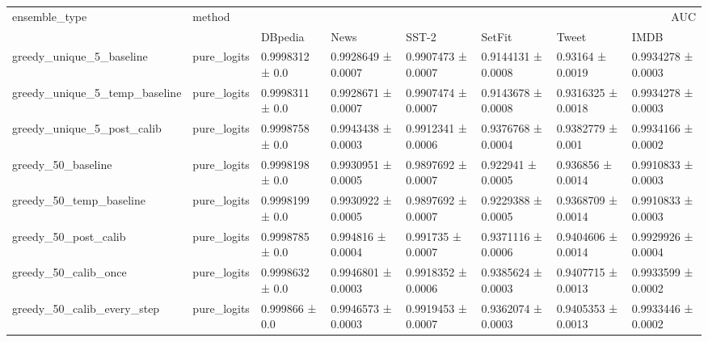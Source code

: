 \begin{tabular}{llllllll}
\toprule
ensemble_type & method & \multicolumn{6}{r}{AUC} \\
 &  & DBpedia & News & SST-2 & SetFit & Tweet & IMDB \\
\midrule
greedy_unique_5_baseline & pure_logits & 0.9998312 ± 0.0 & 0.9928649 ± 0.0007 & 0.9907473 ± 0.0007 & 0.9144131 ± 0.0008 & 0.93164 ± 0.0019 & 0.9934278 ± 0.0003 \\
greedy_unique_5_temp_baseline & pure_logits & 0.9998311 ± 0.0 & 0.9928671 ± 0.0007 & 0.9907474 ± 0.0007 & 0.9143678 ± 0.0008 & 0.9316325 ± 0.0018 & 0.9934278 ± 0.0003 \\
greedy_unique_5_post_calib & pure_logits & 0.9998758 ± 0.0 & 0.9943438 ± 0.0003 & 0.9912341 ± 0.0006 & 0.9376768 ± 0.0004 & 0.9382779 ± 0.001 & 0.9934166 ± 0.0002 \\
greedy_50_baseline & pure_logits & 0.9998198 ± 0.0 & 0.9930951 ± 0.0005 & 0.9897692 ± 0.0007 & 0.922941 ± 0.0005 & 0.936856 ± 0.0014 & 0.9910833 ± 0.0003 \\
greedy_50_temp_baseline & pure_logits & 0.9998199 ± 0.0 & 0.9930922 ± 0.0005 & 0.9897692 ± 0.0007 & 0.9229388 ± 0.0005 & 0.9368709 ± 0.0014 & 0.9910833 ± 0.0003 \\
greedy_50_post_calib & pure_logits & 0.9998785 ± 0.0 & 0.994816 ± 0.0004 & 0.991735 ± 0.0007 & 0.9371116 ± 0.0006 & 0.9404606 ± 0.0014 & 0.9929926 ± 0.0004 \\
greedy_50_calib_once & pure_logits & 0.9998632 ± 0.0 & 0.9946801 ± 0.0003 & 0.9918352 ± 0.0006 & 0.9385624 ± 0.0003 & 0.9407715 ± 0.0013 & 0.9933599 ± 0.0002 \\
greedy_50_calib_every_step & pure_logits & 0.999866 ± 0.0 & 0.9946573 ± 0.0003 & 0.9919453 ± 0.0007 & 0.9362074 ± 0.0003 & 0.9405353 ± 0.0013 & 0.9933446 ± 0.0002 \\
\bottomrule
\end{tabular}
